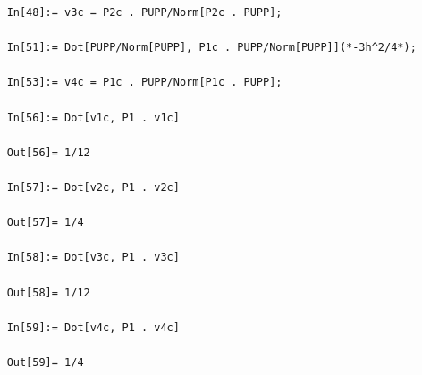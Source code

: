 \documentclass{article}
\theoremstyle{definition}
\begin{document}
\begin{enumerate}[label=(\alph*)]
\begin{lstlisting}
	In[48]:= v3c = P2c . PUPP/Norm[P2c . PUPP];
	
	In[51]:= Dot[PUPP/Norm[PUPP], P1c . PUPP/Norm[PUPP]](*-3h^2/4*);
	
	In[53]:= v4c = P1c . PUPP/Norm[P1c . PUPP];
	
	In[56]:= Dot[v1c, P1 . v1c]
	
	Out[56]= 1/12
	
	In[57]:= Dot[v2c, P1 . v2c]
	
	Out[57]= 1/4
	
	In[58]:= Dot[v3c, P1 . v3c]
	
	Out[58]= 1/12
	
	In[59]:= Dot[v4c, P1 . v4c]
	
	Out[59]= 1/4
	\end{lstlisting}
	
	
	

\end{enumerate}
\end{document}
